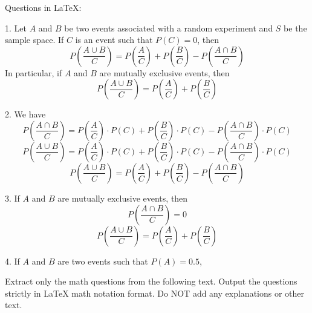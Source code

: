 {{{{{{{{{{{{{{{{{{Questions in LaTeX:

1. Let $A$ and $B$ be two events associated with a random experiment and $S$ be the sample space. If $C$ is an event such that $P(C) = 0$, then
\[P\left(\frac{A \cup B}{C}\right) = P\left(\frac{A}{C}\right) + P\left(\frac{B}{C}\right) - P\left(\frac{A \cap B}{C}\right)\]
In particular, if $A$ and $B$ are mutually exclusive events, then
\[P\left(\frac{A \cup B}{C}\right) = P\left(\frac{A}{C}\right) + P\left(\frac{B}{C}\right)\]

2. We have
\[P\left(\frac{A \cap B}{C}\right) = P\left(\frac{A}{C}\right) \cdot P(C) + P\left(\frac{B}{C}\right) \cdot P(C) - P\left(\frac{A \cap B}{C}\right) \cdot P(C)\]
\[P\left(\frac{A \cup B}{C}\right) = P\left(\frac{A}{C}\right) \cdot P(C) + P\left(\frac{B}{C}\right) \cdot P(C) - P\left(\frac{A \cap B}{C}\right) \cdot P(C)\]
\[P\left(\frac{A \cup B}{C}\right) = P\left(\frac{A}{C}\right) + P\left(\frac{B}{C}\right) - P\left(\frac{A \cap B}{C}\right)\]

3. If $A$ and $B$ are mutually exclusive events, then
\[P\left(\frac{A \cap B}{C}\right) = 0\]
\[P\left(\frac{A \cup B}{C}\right) = P\left(\frac{A}{C}\right) + P\left(\frac{B}{C}\right)\]

4. If $A$ and $B$ are two events such that $P(A) = 0.5$,

Extract only the math questions from the following text.
Output the questions strictly in LaTeX math notation format.
Do NOT add any explanations or other text.

}}}}}}}}}}}}}}}}}}
